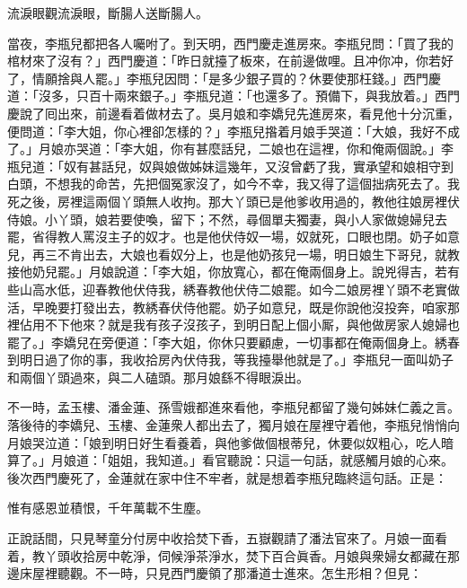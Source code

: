 \begin{myquote}
流淚眼觀流淚眼，斷腸人送斷腸人。
\end{myquote}

當夜，李瓶兒都把各人囑咐了。到天明，西門慶走進房來。李瓶兒問：「買了我的棺材來了沒有？」西門慶道：「昨日就擡了板來，在前邊做哩。且冲你冲，你若好了，情願捨與人罷。」李瓶兒因問：「是多少銀子買的？休要使那枉錢。」西門慶道：「沒多，只百十兩來銀子。」李瓶兒道：「也還多了。預備下，與我放着。」西門慶說了囘出來，前邊看着做材去了。吳月娘和李嬌兒先進房來，看見他十分沉重，便問道：「李大姐，你心裡卻怎樣的？」李瓶兒揝着月娘手哭道：「大娘，我好不成了。」{}月娘亦哭道：「李大姐，你有甚麼話兒，二娘也在這裡，你和俺兩個說。」李瓶兒道：「奴有甚話兒，奴與娘做姊妹這幾年，又沒曾虧了我，實承望和娘相守到白頭，不想我的命苦，先把個冤家沒了，如今不幸，我又得了這個拙病死去了。我死之後，房裡這兩個丫頭無人收拘。那大丫頭已是他爹收用過的，教他往娘房裡伏侍娘。小丫頭，娘若要使喚，留下；不然，尋個單夫獨妻，與小人家做媳婦兒去罷，省得教人罵沒主子的奴才。也是他伏侍奴一場，奴就死，口眼也閉。奶子如意兒，再三不肯出去，大娘也看奴分上，也是他奶孩兒一場，明日娘生下哥兒，就教接他奶兒罷。」月娘說道：「李大姐，你放寬心，都在俺兩個身上。說兇得吉，若有些山高水低，迎春教他伏侍我，綉春教他伏侍二娘罷。如今二娘房裡丫頭不老實做活，早晚要打發出去，教綉春伏侍他罷。奶子如意兒，既是你說他沒投奔，咱家那裡佔用不下他來？就是我有孩子沒孩子，到明日配上個小厮，與他做房家人媳婦也罷了。」李嬌兒在旁便道：「李大姐，你休只要顧慮，一切事都在俺兩個身上。綉春到明日過了你的事，我收拾房內伏侍我，等我擡舉他就是了。」李瓶兒一面叫奶子和兩個丫頭過來，與二人磕頭。那月娘繇不得眼淚出。

不一時，孟玉樓、潘金蓮、孫雪娥都進來看他，李瓶兒都留了幾句姊妹仁義之言。{}落後待的李嬌兒、玉樓、金蓮衆人都出去了，獨月娘在屋裡守着他，李瓶兒悄悄向月娘哭泣道：「娘到明日好生看養着，與他爹做個根蒂兒，休要似奴粗心，吃人暗算了。」{}月娘道：「姐姐，我知道。」看官聽說：只這一句話，就感觸月娘的心來。後次西門慶死了，金蓮就在家中住不牢者，就是想着李瓶兒臨終這句話。正是：

\begin{myquote}
惟有感恩並積恨，千年萬載不生塵。
\end{myquote}

正說話間，只見琴童分付房中收拾焚下香，五嶽觀請了潘法官來了。月娘一面看着，教丫頭收拾房中乾淨，伺候淨茶淨水，焚下百合眞香。月娘與衆婦女都藏在那邊床屋裡聽觀。不一時，只見西門慶領了那潘道士進來。怎生形相？但見：

